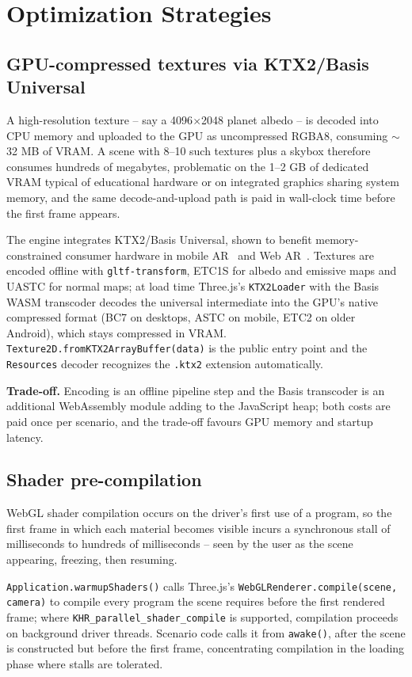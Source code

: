\section{Optimization Strategies}

\subsection{GPU-compressed textures via KTX2/Basis Universal}
A high-resolution texture -- say a 4096$\times$2048 planet albedo -- is decoded into CPU memory and uploaded to the GPU as uncompressed RGBA8, consuming $\sim$32 MB of VRAM. A scene with 8--10 such textures plus a skybox therefore consumes hundreds of megabytes, problematic on the 1--2 GB of dedicated VRAM typical of educational hardware or on integrated graphics sharing system memory, and the same decode-and-upload path is paid in wall-clock time before the first frame appears.

The engine integrates KTX2/Basis Universal, shown to benefit memory-constrained consumer hardware in mobile AR~\cite{Suwandi2026} and Web AR~\cite{Boutsi2023}. Textures are encoded offline with \texttt{gltf-transform}, ETC1S for albedo and emissive maps and UASTC for normal maps; at load time Three.js's \texttt{KTX2Loader} with the Basis WASM transcoder decodes the universal intermediate into the GPU's native compressed format (BC7 on desktops, ASTC on mobile, ETC2 on older Android), which stays compressed in VRAM. \texttt{Texture2D.fromKTX2ArrayBuffer(data)} is the public entry point and the \texttt{Resources} decoder recognizes the \texttt{.ktx2} extension automatically.

\textbf{Trade-off.} Encoding is an offline pipeline step and the Basis transcoder is an additional WebAssembly module adding to the JavaScript heap; both costs are paid once per scenario, and the trade-off favours GPU memory and startup latency.

\subsection{Shader pre-compilation}
WebGL shader compilation occurs on the driver's first use of a program, so the first frame in which each material becomes visible incurs a synchronous stall of milliseconds to hundreds of milliseconds -- seen by the user as the scene appearing, freezing, then resuming.

\texttt{Application.warmupShaders()} calls Three.js's \texttt{WebGLRenderer.\allowbreak compile(\allowbreak scene, camera)} to compile every program the scene requires before the first rendered frame; where \texttt{KHR\_parallel\_shader\_compile} is supported, compilation proceeds on background driver threads. Scenario code calls it from \texttt{awake()}, after the scene is constructed but before the first frame, concentrating compilation in the loading phase where stalls are tolerated.

